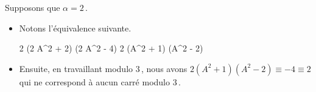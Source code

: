 \medskip

	Supposons que $\alpha = 2$\,.
%
\begin{itemize}
	\item Notons l'équivalence suivante.
    
    \noindent\kern-6pt%
    \begin{stepcalc}[style=ar*, ope=\iff]
    	2 (2 A^2 + 2) (2 A^2 - 4) \in \NNssquare
    	2 (A^2 + 1) (A^2 - 2) \in \NNssquare
    \end{stepcalc}

	\item Ensuite, en travaillant modulo $3$\,, nous avons
	$2 (A^2 + 1) (A^2 - 2) \equiv -4 \equiv 2$ qui ne correspond à aucun carré modulo $3$\,.
	\qedhere 
\end{itemize}